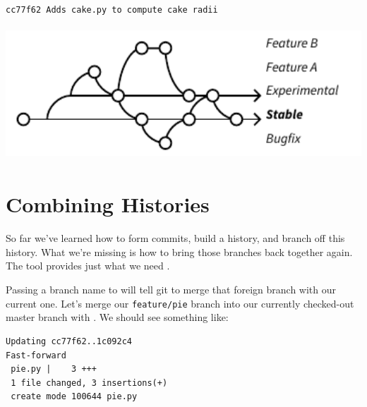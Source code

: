 \documentclass[11pt,letterpaper,twoside]{report}
\begin{document}
\begin{lstlisting}[numbers=none]
cc77f62 Adds cake.py to compute cake radii
\end{lstlisting}

\vspace{\fill}
\begin{center}
\includegraphics[height=5cm]{resources/example_branching.pdf}
\end{center}
\vspace*{\fill}


\chapter{Combining Histories}

So far we've learned how to form commits, build a history, and branch off this
history. What we're missing is how to bring those branches back together again.
The  tool provides just what we need \cite{git-branch-example}.

Passing a branch name to  will tell git to merge that foreign
branch with our current one. Let's merge our \texttt{feature/pie} branch into
our currently checked-out master branch with . We
should see something like:

\begin{lstlisting}[numbers=none]
Updating cc77f62..1c092c4
Fast-forward
 pie.py |    3 +++
 1 file changed, 3 insertions(+)
 create mode 100644 pie.py
\end{lstlisting}

\end{document}
